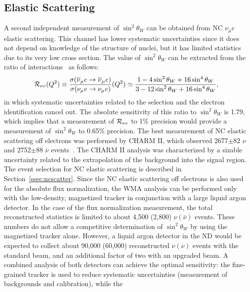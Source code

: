 \subsection{Elastic Scattering} 
A second independent measurement of $\sin^2 \theta_W$ can be obtained
from NC $\nu_\mu e$ elastic scattering. This channel has lower
systematic uncertainties since it does not depend on knowledge of
the structure of nuclei, but it has limited statistics due to its very
low cross section. The value of $\sin^2 \theta_W$ can be extracted
from the ratio of interactions~\cite{Marciano:2003eq} as follows:
\begin{equation} \label{eqn:NCel}
{\cal R}_{\nu e} (Q^2) \equiv \frac{\sigma(\overline{\nu}_\mu e \to \overline{\nu}_\mu e)}{\sigma(\nu_\mu e \to \nu_\mu e)} (Q^2)
\simeq \frac{1 - 4 \sin^2 \theta_W + 16 \sin^4 \theta_W}{3 -12 \sin^2 \theta_W + 16 \sin^4 \theta_W},
\end{equation}
\noindent 
in which systematic uncertainties related to the selection and the
electron identification cancel out.  The absolute sensitivity of this
ratio to $\sin^2 \theta_W$ is 1.79, which implies that a measurement of
${\cal R}_{\nu e}$ to 1\% precision would provide a 
measurement of $\sin^2 \theta_W$ to 0.65\% precision.
The best measurement of NC elastic scattering off electrons was
performed by CHARM II, which observed 2677$\pm82$ $\nu$ and 2752$\pm$88
$\overline{\nu}$ events~\cite{Vilain:1994qy}. 
The CHARM II analysis was characterized by a
sizable uncertainty related to the extrapolation of the background
into the signal region.  
The event selection for NC elastic scattering is described in
Section~\ref{ssec:ncscatter}.  Since the NC elastic scattering off
electrons is also used for the absolute flux normalization, the WMA
analysis can be performed only with the low-density, magnetized tracker
in conjunction with a large liquid argon detector. In the case of the flux
normalization measurement, the total reconstructed statistics is
limited to about 4,500 (2,800) $\nu(\bar \nu)$ events.  These numbers
do not allow a competitive determination of $\sin^2 \theta_W$ by using
the magnetized tracker alone.  However, a  liquid argon detector
in the ND %
would be expected to collect about 90,000 (60,000) reconstructed $\nu
(\overline{\nu})$ events with the standard beam, and an additional factor of two with 
an upgraded  beam. 
A combined analysis of both detectors can achieve the optimal
sensitivity: the fine-grained tracker is used to reduce systematic
uncertainties (measurement of backgrounds and calibration), while the
